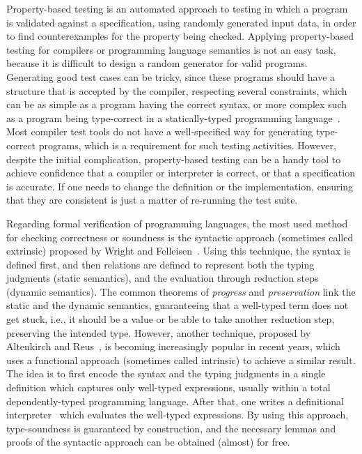 \documentclass[tese,capa,english]{texufpel}
\begin{document}
Property-based testing is an automated approach to testing in which a program is validated against a specification, using randomly generated input data, in order to find counterexamples for the property being checked. Applying property-based testing for compilers or programming language semantics is not an easy task, because it is difficult to design a random generator for valid programs. Generating good test cases can be tricky, since these programs should have a structure that is accepted by the compiler, respecting several constraints, which can be as simple as a program having the correct syntax, or more complex such as a program being type-correct in a statically-typed programming language~\cite{celentano1980compiler,bazzichi1982automatic}. Most compiler test tools do not have a well-specified way for generating type-correct programs, which is a requirement for such testing activities. However, despite the initial complication, property-based testing can be a handy tool to achieve confidence that a compiler or interpreter is correct, or that a specification is accurate. If one needs to change the definition or the implementation, ensuring that they are consistent is just a matter of re-running the test suite.

Regarding formal verification of programming languages, the most used method for checking correctness or soundness is the syntactic approach (sometimes called extrinsic) proposed by Wright and Felleisen~\cite{Wright:1994:SAT:191905.191909}. Using this technique, the syntax is defined first, and then relations are defined to represent both the typing judgments (static semantics), and the evaluation through reduction steps (dynamic semantics). The common theorems of \emph{progress} and \emph{preservation} link the static and the dynamic semantics, guaranteeing that a well-typed term does not get stuck, i.e., it should be a value or be able to take another reduction step, preserving the intended type. However, another technique, proposed by Altenkirch and Reus~\cite{Altenkirch:1999:MPL:647849.737066}, is becoming increasingly popular in recent years, which uses a functional approach (sometimes called intrinsic) to achieve a similar result. The idea is to first encode the syntax and the typing judgments in a single definition which captures only well-typed expressions, usually within a total dependently-typed programming language. After that, one writes a definitional interpreter~\cite{Reynolds:1972:DIH:800194.805852} which evaluates the well-typed expressions. By using this approach, type-soundness is guaranteed by construction, and the necessary lemmas and proofs of the syntactic approach can be obtained (almost) for free.
\end{document}
